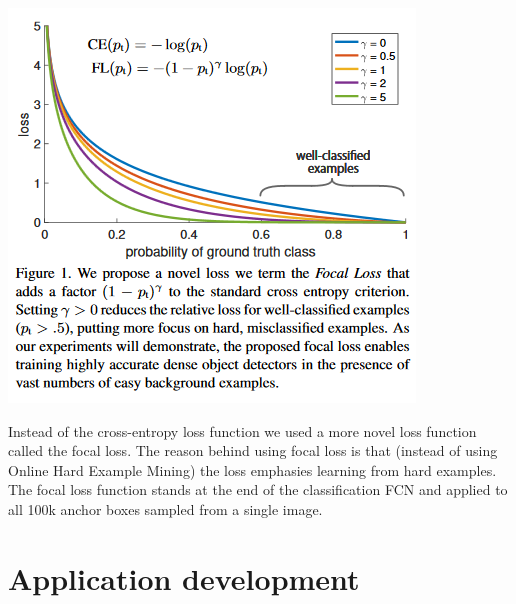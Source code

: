 \includegraphics{Fig/focalloss.PNG}

Instead of the cross-entropy loss function we used a more novel loss function called the focal loss. The reason behind using focal loss is that (instead of using Online Hard Example Mining) the loss emphasies learning from hard examples.
The focal loss function stands at the end of the classification FCN and applied to all 100k anchor boxes sampled from a single image.

\section{Application development}

